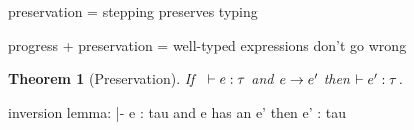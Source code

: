 \documentclass{article}
\let\originalleft\left
\let\originalright\right
\renewcommand{\left}{\mathopen{}\mathclose\bgroup\originalleft}
\renewcommand{\right}{\aftergroup\egroup\originalright}
\newtheorem{Theorem}{Theorem}
\begin{document}
\noindent
preservation = stepping preserves typing

\noindent
progress + preservation = well-typed expressions don't go wrong



\newpage

\resetpfcounter
\begin{Theorem}[Preservation]
  If \usepfcounter[e types]~$\hastype{e}{\tau}$
  and \usepfcounter[e steps] $e \rightarrow e'$
  then \usepfcounter[e' types] $\hastype{e'}{\tau}$.
\end{Theorem}


inversion lemma: |- e : tau and e has an e' then e' : tau
\end{document}
